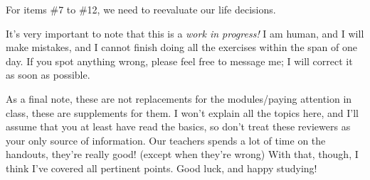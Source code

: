\documentclass{article}
\begin{document}
    \colorbox{CornflowerBlue!50}{
    \begin{minipage}[c]{0.9\textwidth}
        \centering
        For items \#7 to \#12, we need to reevaluate our life decisions.
    \end{minipage}
    }\parindent=0pt \par 
It's very important to note that this is a \textit{work in progress!} I am human, and I will make mistakes, and I cannot finish doing all the exercises within the span of one day. If you spot anything wrong, 
please feel free to message me; I will correct it as soon as possible.\par
As a final note, these are not replacements for the modules/paying attention in class, these are supplements for them. I won't explain all the topics here, and I'll assume that you at least have 
read the basics, so don't treat these reviewers as your only source of information. Our teachers spends a lot of time on the handouts, they're really good! (except when they're wrong) With that, though, I think 
I've covered all pertinent points. Good luck, and happy studying!
\end{document}
